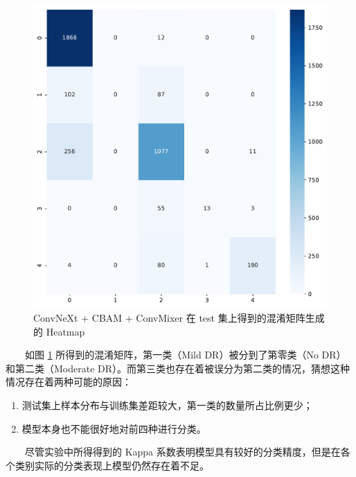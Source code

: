 \documentclass[twocolumn, fontsize=10pt]{article}
\begin{document}
\begin{appendices}
\begin{figure}[H]
    \centering
    \includegraphics[width=0.5\linewidth]{confusion_matrix.pdf}
    \caption{ConvNeXt + CBAM + ConvMixer 在 test 集上得到的混淆矩阵生成的 Heatmap}
    \label{fig:confmat}
\end{figure}

　　如图 \ref{fig:confmat} 所得到的混淆矩阵，第一类（Mild DR）被分到了第零类（No DR）和第二类（Moderate DR）。而第三类也存在着被误分为第二类的情况，猜想这种情况存在着两种可能的原因：
  \begin{enumerate}
      \item 测试集上样本分布与训练集差距较大，第一类的数量所占比例更少；
      \item 模型本身也不能很好地对前四种进行分类。
  \end{enumerate}
  
　　尽管实验中所得得到的 Kappa 系数表明模型具有较好的分类精度，但是在各个类别实际的分类表现上模型仍然存在着不足。
　　

\end{appendices}
\end{document}
